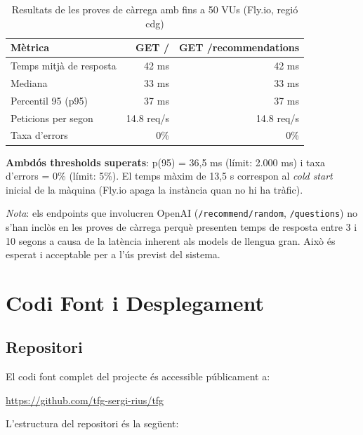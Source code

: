 \documentclass[12pt,a4paper]{article}
\begin{document}
\begin{table}[H]
\centering
\renewcommand{\arraystretch}{1.3}
\begin{tabular}{lrr}
\toprule
\textbf{Mètrica} & \textbf{GET /} & \textbf{GET /recommendations} \\
\midrule
Temps mitjà de resposta     & 42 ms         & 42 ms         \\
Mediana                     & 33 ms         & 33 ms         \\
Percentil 95 (p95)          & 37 ms         & 37 ms         \\
Peticions per segon         & 14.8 req/s    & 14.8 req/s    \\
Taxa d'errors               & 0\%           & 0\%           \\
\bottomrule
\end{tabular}
\caption{Resultats de les proves de càrrega amb fins a 50 VUs (Fly.io, regió cdg)}
\label{tab:results}
\end{table}

\textbf{Ambdós thresholds superats}: p(95) = 36,5 ms (límit: 2.000 ms) i taxa d'errors = 0\% (límit: 5\%). El temps màxim de 13,5 s correspon al \textit{cold start} inicial de la màquina (Fly.io apaga la instància quan no hi ha tràfic).

\textit{Nota}: els endpoints que involucren OpenAI (\texttt{/recommend/random}, \texttt{/questions}) no s'han inclòs en les proves de càrrega perquè presenten temps de resposta entre 3 i 10 segons a causa de la latència inherent als models de llengua gran. Això és esperat i acceptable per a l'ús previst del sistema.

\section{Codi Font i Desplegament}

\subsection{Repositori}

El codi font complet del projecte és accessible públicament a:

\begin{center}
\url{https://github.com/tfg-sergi-rius/tfg}
\end{center}

L'estructura del repositori és la següent:
\end{document}
